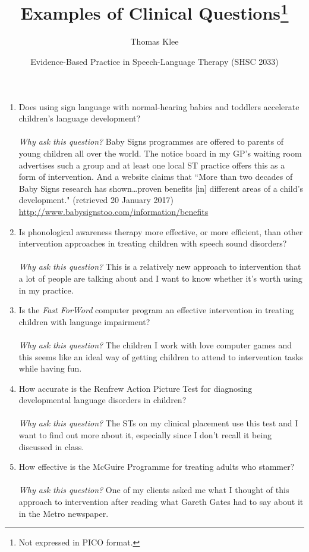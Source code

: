\documentclass[a4paper]{article}
\title{Examples of Clinical Questions\footnote{Not expressed in PICO format.}}
\author{Thomas Klee}
\date{Evidence-Based Practice in Speech-Language Therapy (SHSC 2033)}
\begin{document}
\maketitle

\begin{enumerate}

\item Does using sign language with normal-hearing babies and toddlers accelerate children's language development? \\
\\
   \emph{Why ask this question?} Baby Signs programmes are offered to parents of young children all over the world. The notice board in my GP's waiting room advertises such a group and at least one local ST practice offers this as a form of intervention. And a website claims that ``More than two decades of Baby Signs\textsuperscript{\textregistered{}} research has shown\ldots proven benefits [in] different areas of a child's development." (retrieved 20 January 2017) \url{http://www.babysignstoo.com/information/benefits}
		
\item Is phonological awareness therapy more effective, or more efficient, than other intervention approaches in treating children with speech sound disorders? \\
\\
   \emph{Why ask this question?} This is a relatively new approach to intervention that a lot of people are talking about and I want to know whether it's worth using in my practice.
		
\item Is the \emph{Fast ForWord} computer program an effective intervention in treating children with language impairment? \\
\\
   \emph{Why ask this question?} The children I work with love computer games and this seems like an ideal way of getting children to attend to 	intervention tasks while having fun.
	
\item How accurate is the Renfrew Action Picture Test for diagnosing developmental language disorders in children? \\
\\
   \emph{Why ask this question?} The STs on my clinical placement use this test and I want to find out more about it, especially since I don't recall it being discussed in class.
	
\item How effective is the McGuire Programme for treating adults who stammer? \\
\\
   \emph{Why ask this question?} One of my clients asked me what I thought of this approach to intervention after reading what Gareth Gates had to say about it in the Metro newspaper.
	

\end{enumerate}
\end{document}
